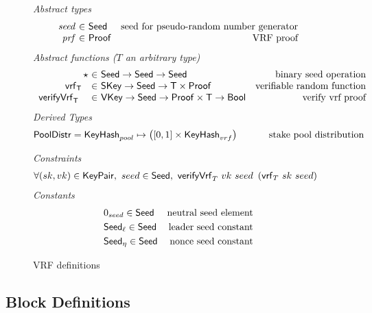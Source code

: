 \begin{figure}[htb]
  \emph{Abstract types}
  \begin{equation*}
    \begin{array}{r@{~\in~}lr}
      \var{seed} & \Seed  & \text{seed for pseudo-random number generator}\\
      \var{prf} & \Proof  & \text{VRF proof}\\
    \end{array}
  \end{equation*}
  \emph{Abstract functions ($T$ an arbitrary type)}
  \begin{equation*}
    \begin{array}{r@{~\in~}lr}
      \seedOp & \Seed \to \Seed \to \Seed & \text{binary seed operation} \\
      \vrf{\T}{}{} & \SKey \to \Seed \to \T\times\Proof
                   & \text{verifiable random function} \\
      \verifyVrf{\T}{}{}{} & \VKey \to \Seed \to \Proof\times\T \to \Bool
                           & \text{verify vrf proof} \\
    \end{array}
  \end{equation*}
  \emph{Derived Types}
  \begin{align*}
    \mathsf{PoolDistr} = \mathsf{KeyHash}_{pool} \mapsto \left([0, 1]\times\mathsf{KeyHash}_{vrf}\right)
      \text{ \hspace{1cm}stake pool distribution}
  \end{align*}

  \emph{Constraints}
  \begin{align*}
    & \forall (sk, vk) \in \mathsf{KeyPair},~ seed \in \mathsf{Seed},~
    \mathsf{verifyVrf}_{T} ~ vk ~ seed ~\left(\mathsf{vrf}_{T} ~ sk ~ seed\right)
  \end{align*}
  \emph{Constants}
  \begin{align*}
    & 0_{seed} \in \mathsf{Seed} & \text{neutral seed element} \\
    & \mathsf{Seed}_\ell \in \mathsf{Seed} & \text{leader seed constant} \\
    & \mathsf{Seed}_\eta \in \mathsf{Seed} & \text{nonce seed constant}\\
  \end{align*}

  \caption{VRF definitions}
  \label{fig:defs-vrf}
\end{figure}

\clearpage

\subsection{Block Definitions}
\label{sec:defs-blocks}

